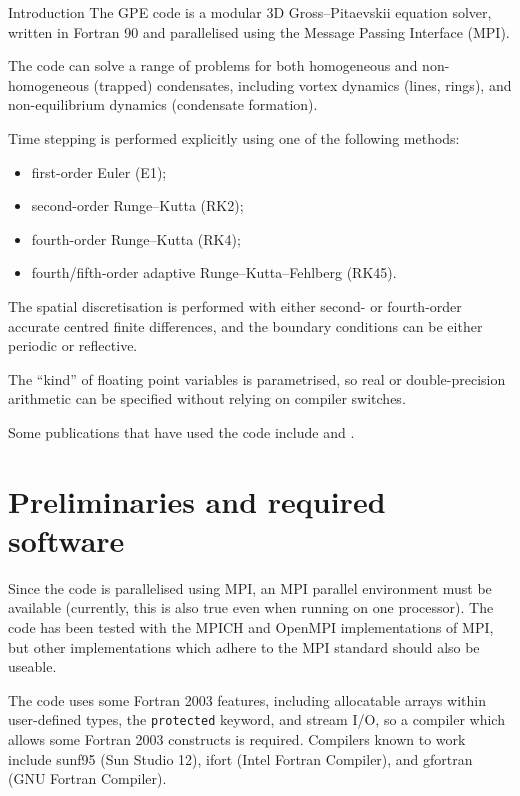 \begin{chapter}{\label{cha:introduction}Introduction}
  The GPE code is a modular 3D Gross--Pitaevskii equation solver, written in
  Fortran 90 and parallelised using the Message Passing Interface (MPI).
  
  The code can solve a range of problems for both homogeneous and
  non-homogeneous (trapped) condensates, including vortex dynamics (lines,
  rings), and non-equilibrium dynamics (condensate formation).

  Time stepping is performed explicitly using one of the following methods:
  \begin{itemize}
    \item first-order Euler (E1);
    \item second-order Runge--Kutta (RK2);
    \item fourth-order Runge--Kutta (RK4);
    \item fourth/fifth-order adaptive Runge--Kutta--Fehlberg (RK45).
  \end{itemize}
  The spatial discretisation is performed with either second- or fourth-order
  accurate centred finite differences, and the boundary conditions can be
  either periodic or reflective.

  The ``kind'' of floating point variables is parametrised, so real or
  double-precision arithmetic can be specified without relying on compiler
  switches.

  Some publications that have used the code include \citet{AYB08} and
  \citet{WBPYW10}.

  \section{\label{sec:prelim}Preliminaries and required software}
  Since the code is parallelised using MPI, an MPI parallel environment must be
  available (currently, this is also true even when running on one processor).
  The code has been tested with the MPICH and OpenMPI implementations of MPI,
  but other implementations which adhere to the MPI standard should also be
  useable.

  The code uses some Fortran 2003 features, including allocatable arrays within
  user-defined types, the \verb"protected" keyword, and stream I/O, so a
  compiler which allows some Fortran 2003 constructs is required.  Compilers
  known to work include sunf95 (Sun Studio 12), ifort (Intel Fortran Compiler),
  and gfortran (GNU Fortran Compiler).


\end{chapter}
